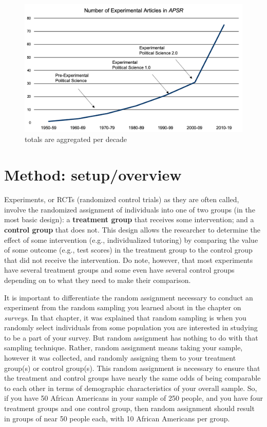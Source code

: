 \documentclass{book}
\begin{document}
\begin{figure}
\hypertarget{fig:trend}{%
\centering
\includegraphics{images/trend.png}
\caption{totals are aggregated per decade}\label{fig:trend}
}
\end{figure}

\hypertarget{method-setupoverview}{%
\section{Method: setup/overview}\label{method-setupoverview}}

Experiments, or RCTs (randomized control trials) as they are often called,
involve the randomized assignment of individuals into one of two groups (in
the most basic design): a \textbf{treatment group} that receives some
intervention; and a \textbf{control group} that does not. This design allows
the researcher to determine the effect of some intervention (e.g.,
individualized tutoring) by comparing the value of some outcome (e.g., test
scores) in the treatment group to the control group that did not receive the
intervention. Do note, however, that most experiments have several treatment
groups and some even have several control groups depending on to what they
need to make their comparison.

It is important to differentiate the random assignment necessary to conduct an
experiment from the random sampling you learned about in the chapter on
\emph{surveys}. In that chapter, it was explained that random sampling is when
you randomly select individuals from some population you are interested in
studying to be a part of your survey. But random assignment has nothing to do
with that sampling technique. Rather, random assignment means taking your
sample, however it was collected, and randomly assigning them to your
treatment group(s) or control group(s). This random assignment is necessary to
ensure that the treatment and control groups have nearly the same odds of
being comparable to each other in terms of demographic characteristics of your
overall sample. So, if you have 50 African Americans in your sample of 250
people, and you have four treatment groups and one control group, then random
assignment should result in groups of near 50 people each, with 10 African
Americans per group.
\end{document}
